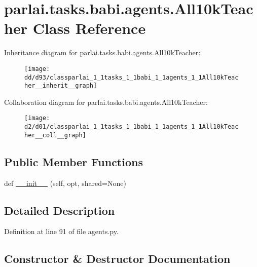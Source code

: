 \hypertarget{classparlai_1_1tasks_1_1babi_1_1agents_1_1All10kTeacher}{}\section{parlai.\+tasks.\+babi.\+agents.\+All10k\+Teacher Class Reference}
\label{classparlai_1_1tasks_1_1babi_1_1agents_1_1All10kTeacher}


Inheritance diagram for parlai.\+tasks.\+babi.\+agents.\+All10k\+Teacher\+:
\nopagebreak
\begin{figure}[H]
\begin{center}
\leavevmode
\texttt{[image: dd/d93/classparlai\_1\_1tasks\_1\_1babi\_1\_1agents\_1\_1All10kTeacher\_\_inherit\_\_graph]}
\end{center}
\end{figure}


Collaboration diagram for parlai.\+tasks.\+babi.\+agents.\+All10k\+Teacher\+:
\nopagebreak
\begin{figure}[H]
\begin{center}
\leavevmode
\texttt{[image: d2/d01/classparlai\_1\_1tasks\_1\_1babi\_1\_1agents\_1\_1All10kTeacher\_\_coll\_\_graph]}
\end{center}
\end{figure}
\subsection*{Public Member Functions}
\begin{DoxyCompactItemize}
\item 
def \hyperlink{classparlai_1_1tasks_1_1babi_1_1agents_1_1All10kTeacher_a6216cea03cc9b69cea9782819e2ede1d}{\+\_\+\+\_\+init\+\_\+\+\_\+} (self, opt, shared=None)
\end{DoxyCompactItemize}


\subsection{Detailed Description}


Definition at line 91 of file agents.\+py.



\subsection{Constructor \& Destructor Documentation}
\mbox{\label{classparlai_1_1tasks_1_1babi_1_1agents_1_1All10kTeacher_a6216cea03cc9b69cea9782819e2ede1d}} 
